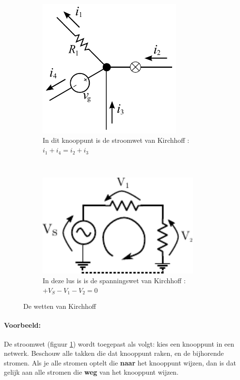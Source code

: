\documentclass{article}
\begin{document}
			\begin{figure}[htbp!]
				\centering
				\begin{subfigure}[b]{0.45\linewidth}
					\centering
					\includegraphics[width=0.8\textwidth]{kcl.pdf}
					\caption{In dit knooppunt is de stroomwet van Kirchhoff : $i_1 + i_4 = i_2+i_3$}
					\label{subfig:kcl}
				\end{subfigure}
				~
				\begin{subfigure}[b]{0.45\linewidth}
					\centering
					\includegraphics[width=0.9\textwidth]{kvl.pdf}
					\caption{In deze lus is is de spanningswet van Kirchhoff : $ + V_S - V_1 - V_2 = 0$}
					\label{subfig:kvl}
				\end{subfigure}
			\caption{De wetten van Kirchhoff}
			\label{fig:kirchoff}
			\end{figure}

			\paragraph*{Voorbeeld:} De stroomwet (figuur \ref{subfig:kcl}) wordt toegepast als volgt: kies een knooppunt in een netwerk. Beschouw alle takken die dat knooppunt raken, en de bijhorende stromen. Als je alle stromen optelt die \textbf{naar} het knooppunt wijzen, dan is dat gelijk aan alle stromen die \textbf{weg} van het knooppunt wijzen.
\end{document}
